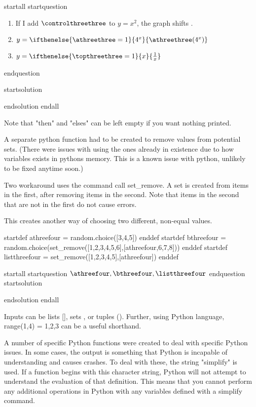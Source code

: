 startall
startquestion \begin{enumerate}
\item If I add $\controlthreethree$ to $y=x^2$, the graph shifts .
\item $y = \ifthenelse{\athreethree = 1}{4^x}{\athreethree(4^x)}$
\item $y = \ifthenelse{\topthreethree = 1}{x}{\frac{1}{x}}$
\end{enumerate}
endquestion

startsolution \item  endsolution
endall

Note that "then" and "elses" can be left empty if you want nothing printed.




A separate python function had to be created to remove values from potential sets. (There were issues with using the ones already in existence due to how variables exists in pythons memory. This is a known issue with python, unlikely to be fixed anytime soon.)

Two workaround uses the command call set_remove. A set is created from items in the first, after removing items in the second. Note that items in the second that are not in the first do not cause errors.

This creates another way of choosing two different, non-equal values.

startdef athreefour = random.choice([3,4,5]) enddef
startdef bthreefour = random.choice(set_remove([1,2,3,4,5,6],[athreefour,6,7,8])) enddef
startdef listthreefour = set_remove([1,2,3,4,5],[athreefour]) enddef

startall
startquestion $\athreefour, \bthreefour, \listthreefour$ endquestion
startsolution \item  endsolution
endall

Inputs can be lists [], sets {}, or tuples (). Further, using Python language, range(1,4) = {1,2,3} can be a useful shorthand.





A number of specific Python functions were created to deal with specific Python issues. In some cases, the output is something that Python is incapable of understanding and causes crashes. To deal with these, the string "simplify" is used. If a function begins with this character string, Python will not attempt to understand the evaluation of that definition. This means that you cannot perform any additional operations in Python with any variables defined with a simplify command.

